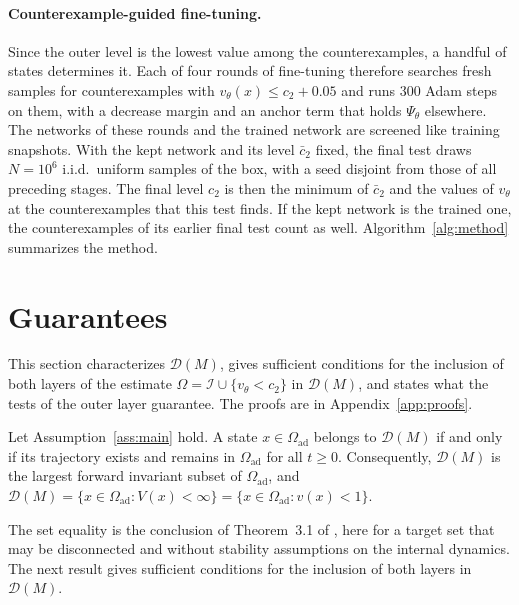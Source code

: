 \documentclass{l4dc2027}
\newcommand{\Oad}{\Omega_{\mathrm{ad}}}
\newcommand{\D}{\mathcal D}
\newcommand{\I}{\mathcal I}
\begin{document}
\paragraph{Counterexample-guided fine-tuning.} Since the outer level is the lowest value among the counterexamples, a handful of states determines it. Each of four rounds of fine-tuning therefore searches fresh samples for counterexamples with $v_\theta(x)\le c_2+0.05$ and runs 300 Adam steps on them, with a decrease margin and an anchor term that holds $\Psi_\theta$ elsewhere. The networks of these rounds and the trained network are screened like training snapshots. With the kept network and its level $\bar c_2$ fixed, the final test draws $N=10^6$ i.i.d.\ uniform samples of the box, with a seed disjoint from those of all preceding stages. The final level $c_2$ is then the minimum of $\bar c_2$ and the values of $v_\theta$ at the counterexamples that this test finds. If the kept network is the trained one, the counterexamples of its earlier final test count as well. Algorithm~\ref{alg:method} summarizes the method.

\vspace{-0.15in}

\section{Guarantees}\label{sec:guarantees}

This section characterizes $\D(M)$, gives sufficient conditions for the inclusion of both layers of the estimate $\Omega=\I\cup\{v_\theta<c_2\}$ in $\D(M)$, and states what the tests of the outer layer guarantee. The proofs are in Appendix~\ref{app:proofs}.

\begin{theorem}\label{thm:gz}
Let Assumption~\ref{ass:main} hold. A state $x\in\Oad$ belongs to $\D(M)$ if and only if its trajectory exists and remains in $\Oad$ for all $t\ge0$. Consequently, $\D(M)$ is the largest forward invariant subset of $\Oad$, and $\D(M)=\{x\in\Oad:V(x)<\infty\}=\{x\in\Oad:v(x)<1\}$.
\end{theorem}

The set equality is the conclusion of Theorem~3.1 of \citet{gruene2015}, here for a target set that may be disconnected and without stability assumptions on the internal dynamics. The next result gives sufficient conditions for the inclusion of both layers in $\D(M)$.
\end{document}
